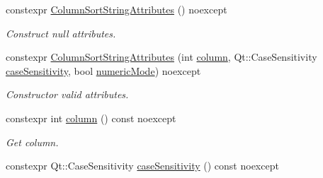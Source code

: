 \begin{DoxyCompactItemize}
\item 
constexpr \hyperlink{class_mdt_1_1_item_model_1_1_column_sort_string_attributes_a925d9c0ebaf9400daad10110b18a5c85}{Column\+Sort\+String\+Attributes} () noexcept\hypertarget{class_mdt_1_1_item_model_1_1_column_sort_string_attributes_a925d9c0ebaf9400daad10110b18a5c85}{}\label{class_mdt_1_1_item_model_1_1_column_sort_string_attributes_a925d9c0ebaf9400daad10110b18a5c85}

\begin{DoxyCompactList}\small\item\em Construct null attributes. \end{DoxyCompactList}\item 
constexpr \hyperlink{class_mdt_1_1_item_model_1_1_column_sort_string_attributes_ae1ca36d53bbbf863dbb648af0987f0e0}{Column\+Sort\+String\+Attributes} (int \hyperlink{class_mdt_1_1_item_model_1_1_column_sort_string_attributes_a007834ff314c6d2cf792dc15c8c4d413}{column}, Qt\+::\+Case\+Sensitivity \hyperlink{class_mdt_1_1_item_model_1_1_column_sort_string_attributes_a7b3b16ae222b16c66d57edec75b50910}{case\+Sensitivity}, bool \hyperlink{class_mdt_1_1_item_model_1_1_column_sort_string_attributes_a64b161abc0c58dd14a8721e41dea34d6}{numeric\+Mode}) noexcept
\begin{DoxyCompactList}\small\item\em Constructor valid attributes. \end{DoxyCompactList}\item 
constexpr int \hyperlink{class_mdt_1_1_item_model_1_1_column_sort_string_attributes_a007834ff314c6d2cf792dc15c8c4d413}{column} () const noexcept\hypertarget{class_mdt_1_1_item_model_1_1_column_sort_string_attributes_a007834ff314c6d2cf792dc15c8c4d413}{}\label{class_mdt_1_1_item_model_1_1_column_sort_string_attributes_a007834ff314c6d2cf792dc15c8c4d413}

\begin{DoxyCompactList}\small\item\em Get column. \end{DoxyCompactList}\item 
constexpr Qt\+::\+Case\+Sensitivity \hyperlink{class_mdt_1_1_item_model_1_1_column_sort_string_attributes_a7b3b16ae222b16c66d57edec75b50910}{case\+Sensitivity} () const noexcept\hypertarget{class_mdt_1_1_item_model_1_1_column_sort_string_attributes_a7b3b16ae222b16c66d57edec75b50910}{}\label{class_mdt_1_1_item_model_1_1_column_sort_string_attributes_a7b3b16ae222b16c66d57edec75b50910}


\end{DoxyCompactItemize}
